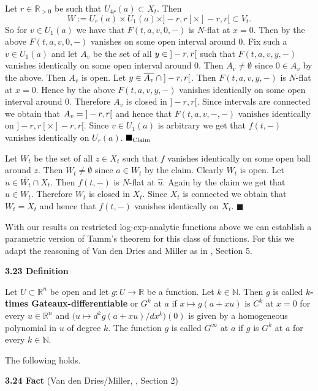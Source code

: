 \documentclass[12pt]{article}
\def\vs{\vspace}
\begin{document}
\vs{0.1cm}
Let $r \in \mathbb{R}_{>0}$ be such that $U_{4r}(a)\subset X_t$. Then 
$$W:=U_r(a) \times U_1(a) \times ]-r,r[ \times ]-r,r[ \subset V_t.$$
So for $v \in U_1(a)$ we have that $F(t,a,v,0,-)$ is $N$-flat at $x=0$. Then by the above $F(t,a,v,0,-)$ vanishes on some open interval around $0$. Fix such a $v \in U_1(a)$ and let $A_v$ be the set of all $y \in \textnormal{} ]-r,r[$ such that $F(t,a,v,y,-)$ vanishes identically on some open interval around $0$. Then $A_v \neq \emptyset$ since $0 \in A_v$ by the above. Then $A_v$ is open. Let $y \in \overline{A_v} \textnormal{} \cap \textnormal{} ]-r,r[$. Then $F(t,a,v,y,-)$ is $N$-flat at $x=0$. Hence by the above $F(t,a,v,y,-)$ vanishes identically on some open interval around $0$. Therefore $A_v$ is closed in $]-r,r[$. Since intervals are connected we obtain that $A_v= \textnormal{}]-r,r[$ and hence that $F(t,a,v,-,-)$ vanishes identically on $]-r,r[ \times ]-r,r[$. Since $v \in U_1(a)$ is arbitrary we get that $f(t,-)$ vanishes identically on $U_r(a)$.
\hfill$\blacksquare_\textnormal{Claim}$

\vs{0.3cm}
Let $W_t$ be the set of all $z \in X_t$ such that $f$ vanishes identically on some open ball around $z$.
Then $W_t \neq \emptyset$ since $a \in W_t$ by the claim. Clearly $W_t$ is open.
Let $\hat{u} \in \overline{W_t} \cap X_t$. Then $f(t,-)$ is $N$-flat at $\hat{u}$. Again by the claim we get that $\hat{u} \in W_t$.
Therefore $W_t$ is closed in $X_t$. Since $X_t$ is connected we obtain that $W_t=X_t$ and hence that $f(t,-)$ vanishes identically on $X_t$.
\hfill$\blacksquare$

\vs{0.5cm}
With our results on restricted log-exp-analytic functions above we can establish a parametric version of Tamm's theorem for this class of functions. For this we adapt the reasoning of Van den Dries and Miller as in \cite{5}, Section 5.

\vs{0.5cm}
{\bf3.23 Definition}

\vs{0.1cm}
Let $U \subset \mathbb{R}^n$ be open and let $g:U \to \mathbb{R}$ be a function. Let $k \in \mathbb{N}$. Then $g$ is called {\bf $k$-times Gateaux-differentiable} or $G^k$ at $a$ if $x \mapsto g(a+xu)$ is $C^k$ at $x=0$ for every $u \in \mathbb{R}^n$ and $\big(u \mapsto d^kg(a+xu)/dx^k\big)(0)$ is given by a homogeneous polynomial in $u$ of degree $k$. The function $g$ is called $G^\infty$ at $a$ if $g$ is $G^k$ at $a$ for every $k\in \mathbb{N}$. 

\vs{0.3cm}
The following holds.

\vs{0.5cm}
{\bf3.24 Fact} (Van den Dries/Miller, \cite{5}, Section 2)
\end{document}
